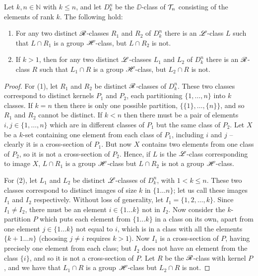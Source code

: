 \begin{lemma}
  \label{lem:dk-hclasses}
  Let $k,n \in \mathbb{N}$ with $k \leq n$, and let $D_k^n$ be the $\DD$-class
  of $\mathcal{T}_n$ consisting of the elements of rank $k$.  The following hold:
  \begin{enumerate}[\rm(1)]
  \item For any two distinct $\mathrel{\mathscr{R}}$-classes $R_1$ and $R_2$ of $D_k^n$ there is an
    $\mathrel{\mathscr{L}}$-class $L$ such that $L \cap R_1$ is a group $\mathrel{\mathscr{H}}$-class, but
    $L \cap R_2$ is not.
  \item If $k > 1$, then for any two distinct $\mathrel{\mathscr{L}}$-classes $L_1$ and $L_2$ of
    $D_k^n$ there is an $\mathrel{\mathscr{R}}$-class $R$ such that $L_1 \cap R$ is a group
    $\mathrel{\mathscr{H}}$-class, but $L_2 \cap R$ is not.
  \end{enumerate}
  \begin{proof}
    For (1), let $R_1$ and $R_2$ be distinct $\mathrel{\mathscr{R}}$-classes of $D_k^n$.  These two
    classes correspond to distinct kernels $P_1$ and $P_2$, each partitioning
    $\{1, \dots, n\}$ into $k$ classes.  If $k=n$ then there is only one
    possible partition, $\big\{\{1\}, \dots, \{n\}\big\}$, and so $R_1$ and
    $R_2$ cannot be distinct.  If $k<n$ then there must be a pair of elements
    $i,j \in \{1,\dots, n\}$ which are in different classes of $P_1$ but the
    same class of $P_2$.  Let $X$ be a $k$-set containing one element from each
    class of $P_1$, including $i$ and $j$ -- clearly it is a cross-section of
    $P_1$.  But now $X$ contains two elements from one class of $P_2$, so it is
    not a cross-section of $P_2$.  Hence, if $L$ is the $\mathrel{\mathscr{L}}$-class
    corresponding to image $X$, $L \cap R_1$ is a group $\mathrel{\mathscr{H}}$-class but
    $L \cap R_2$ is not a group $\mathrel{\mathscr{H}}$-class.

    For (2), let $L_1$ and $L_2$ be distinct $\mathrel{\mathscr{L}}$-classes of $D_k^n$, with
    $1 < k \leq n$.  These two classes correspond to distinct images of size $k$
    in $\{1 \dots n\}$; let us call these images $I_1$ and $I_2$ respectively.
    Without loss of generality, let $I_1 = \{1, 2, \dots, k\}$.  Since
    $I_1 \neq I_2$, there must be an element $i \in \{1 \dots k\}$ not in $I_2$.
    Now consider the $k$-partition $P$ which puts each element from
    $\{1 \dots k\}$ in a class on its own, apart from one element
    $j \in \{1 \dots k\}$ not equal to $i$, which is in a class with all the
    elements $\{k+1 \dots n\}$ (choosing $j \neq i$ requires $k > 1$).  Now
    $I_1$ is a cross-section of $P$, having precisely one element from each
    class; but $I_2$ does not have an element from the class $\{i\}$, and so it
    is not a cross-section of $P$.  Let $R$ be the $\mathrel{\mathscr{R}}$-class with kernel $P$,
    and we have that $L_1 \cap R$ is a group $\mathrel{\mathscr{H}}$-class but $L_2 \cap R$ is
    not.
  \end{proof}
\end{lemma}

